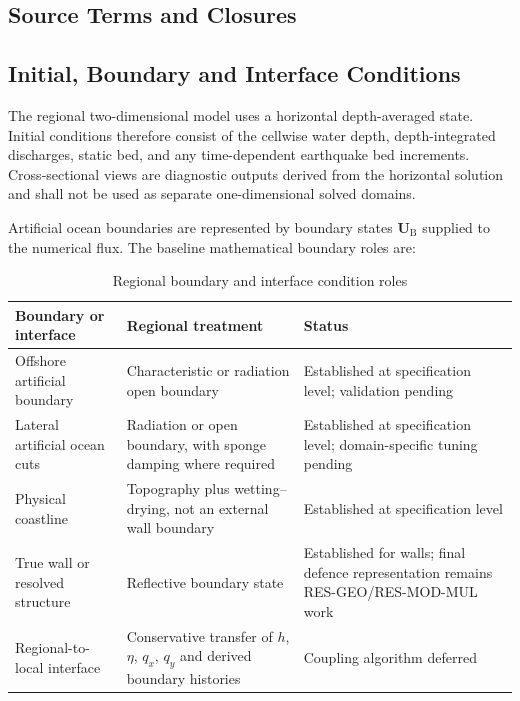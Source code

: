 
\subsection{Source Terms and Closures}
\label{sec:res-mod-ibc-source-terms-closures}


\subsection{Initial, Boundary and Interface Conditions}
\label{sec:res-mod-ibc-initial-boundary-interface-conditions}

The regional two-dimensional model uses a horizontal depth-averaged
state. Initial conditions therefore consist of the cellwise water depth,
depth-integrated discharges, static bed, and any time-dependent
earthquake bed increments. Cross-sectional views are diagnostic outputs
derived from the horizontal solution and shall not be used as separate
one-dimensional solved domains.

Artificial ocean boundaries are represented by boundary states
$\mathbf{U}_{\mathrm{B}}$ supplied to the numerical flux. The baseline
mathematical boundary roles are:

\begin{table}[htbp]
  \centering
  \small
  \renewcommand{\arraystretch}{1.2}
  \begin{tabular}{
      p{}
      p{}
      p{}
    }
    \hline
    Boundary or interface
    &
    Regional treatment
    &
    Status
    \\
    \hline
    Offshore artificial boundary
    &
    Characteristic or radiation open boundary
    &
    Established at specification level; validation pending
    \\
    Lateral artificial ocean cuts
    &
    Radiation or open boundary, with sponge damping where required
    &
    Established at specification level; domain-specific tuning pending
    \\
    Physical coastline
    &
    Topography plus wetting--drying, not an external wall boundary
    &
    Established at specification level
    \\
    True wall or resolved structure
    &
    Reflective boundary state
    &
    Established for walls; final defence representation remains
    RES-GEO/RES-MOD-MUL work
    \\
    Regional-to-local interface
    &
    Conservative transfer of $h$, $\eta$, $q_x$, $q_y$ and derived
    boundary histories
    &
    Coupling algorithm deferred
    \\
    \hline
  \end{tabular}
  \caption{Regional boundary and interface condition roles}
  \label{tab:res-mod-ibc-regional-boundary-roles}
\end{table}

